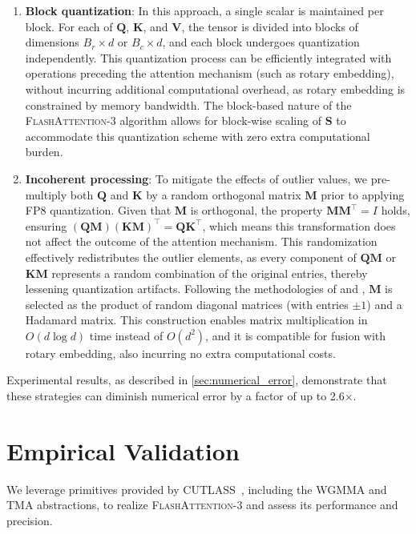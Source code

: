 \begin{enumerate}

\item \textbf{Block quantization}: In this approach, a single scalar is maintained per block. For each of $\mathbf{Q}$, $\mathbf{K}$, and $\mathbf{V}$, the tensor is divided into blocks of dimensions $B_r \times d$ or $B_c \times d$, and each block undergoes quantization independently. This quantization process can be efficiently integrated with operations preceding the attention mechanism (such as rotary embedding), without incurring additional computational overhead, as rotary embedding is constrained by memory bandwidth. The block-based nature of the \textsc{FlashAttention-3} algorithm allows for block-wise scaling of $\mathbf{S}$ to accommodate this quantization scheme with zero extra computational burden.

\item \textbf{Incoherent processing}: To mitigate the effects of outlier values, we pre-multiply both $\mathbf{Q}$ and $\mathbf{K}$ by a random orthogonal matrix $\mathbf{M}$ prior to applying FP8 quantization. Given that $\mathbf{M}$ is orthogonal, the property $\mathbf{M} \mathbf{M}^\top = I$ holds, ensuring $(\mathbf{Q} \mathbf{M}) (\mathbf{K} \mathbf{M})^\top = \mathbf{Q} \mathbf{K}^\top$, which means this transformation does not affect the outcome of the attention mechanism. This randomization effectively redistributes the outlier elements, as every component of $\mathbf{Q} \mathbf{M}$ or $\mathbf{K} \mathbf{M}$ represents a random combination of the original entries, thereby lessening quantization artifacts. Following the methodologies of \citet{chee2024quip} and \citet{tseng2024quip}, $\mathbf{M}$ is selected as the product of random diagonal matrices (with entries $\pm 1$) and a Hadamard matrix. This construction enables matrix multiplication in $O(d \log d)$ time instead of $O(d^2)$, and it is compatible for fusion with rotary embedding, also incurring no extra computational costs.
\end{enumerate}

Experimental results, as described in \cref{sec:numerical_error}, demonstrate that these strategies can diminish numerical error by a factor of up to 2.6$\times$.

\section{Empirical Validation}
\label{sec:exp}

We leverage primitives provided by CUTLASS~\citep{Thakkar_CUTLASS_2023}, including the WGMMA and TMA abstractions, to realize \textsc{FlashAttention-3} and assess its performance and precision.

